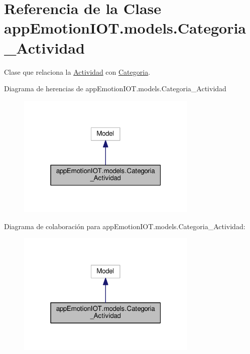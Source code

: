 \hypertarget{classappEmotionIOT_1_1models_1_1Categoria__Actividad}{}\section{Referencia de la Clase app\+Emotion\+I\+O\+T.\+models.\+Categoria\+\_\+\+Actividad}
\label{classappEmotionIOT_1_1models_1_1Categoria__Actividad}


Clase que relaciona la \hyperlink{classappEmotionIOT_1_1models_1_1Actividad}{Actividad} con \hyperlink{classappEmotionIOT_1_1models_1_1Categoria}{Categoria}.  




Diagrama de herencias de app\+Emotion\+I\+O\+T.\+models.\+Categoria\+\_\+\+Actividad
\nopagebreak
\begin{figure}[H]
\begin{center}
\leavevmode
\includegraphics[width=244pt]{classappEmotionIOT_1_1models_1_1Categoria__Actividad__inherit__graph}
\end{center}
\end{figure}


Diagrama de colaboración para app\+Emotion\+I\+O\+T.\+models.\+Categoria\+\_\+\+Actividad\+:
\nopagebreak
\begin{figure}[H]
\begin{center}
\leavevmode
\includegraphics[width=244pt]{classappEmotionIOT_1_1models_1_1Categoria__Actividad__coll__graph}
\end{center}
\end{figure}

